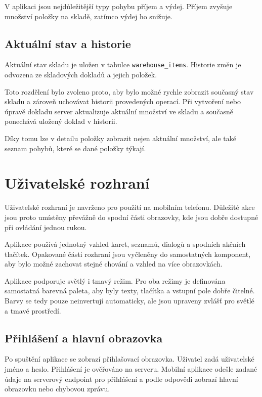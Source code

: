 \documentclass[czech, oth, kiv, he, pdf, viewonly]{fasthesis}
\begin{document}
V aplikaci jsou nejdůležitější typy pohybu příjem a výdej. Příjem
zvyšuje množství položky na skladě, zatímco výdej ho snižuje.

\section{Aktuální stav a historie}

Aktuální stav skladu je uložen v tabulce \texttt{warehouse\_items}.
Historie změn je odvozena ze skladových dokladů a jejich položek.

Toto rozdělení bylo zvoleno proto, aby bylo možné rychle zobrazit
současný stav skladu a zároveň uchovávat historii provedených operací.
Při vytvoření nebo úpravě dokladu server aktualizuje aktuální množství
ve skladu a současně ponechává uložený doklad v historii.

Díky tomu lze v detailu položky zobrazit nejen aktuální množství, ale
také seznam pohybů, které se dané položky týkají.

\chapter{Uživatelské rozhraní}

Uživatelské rozhraní je navrženo pro použití na mobilním telefonu.
Důležité akce jsou proto umístěny převážně do spodní části obrazovky,
kde jsou dobře dostupné při ovládání jednou rukou.

Aplikace používá jednotný vzhled karet, seznamů, dialogů a spodních
akčních tlačítek. Opakované části rozhraní jsou vyčleněny do
samostatných komponent, aby bylo možné zachovat stejné chování a vzhled
na více obrazovkách.

Aplikace podporuje světlý i tmavý režim. Pro oba režimy je definována
samostatná barevná paleta, aby byly texty, tlačítka a vstupní pole
dobře čitelné. Barvy se tedy pouze neinvertují automaticky, ale jsou
upraveny zvlášť pro světlé a tmavé prostředí.

\section{Přihlášení a hlavní obrazovka}

Po spuštění aplikace se zobrazí přihlašovací obrazovka. Uživatel zadá
uživatelské jméno a heslo. Přihlášení je ověřováno na serveru. Mobilní
aplikace odešle zadané údaje na serverový endpoint pro přihlášení
a podle odpovědi zobrazí hlavní obrazovku nebo chybovou zprávu.
\end{document}
